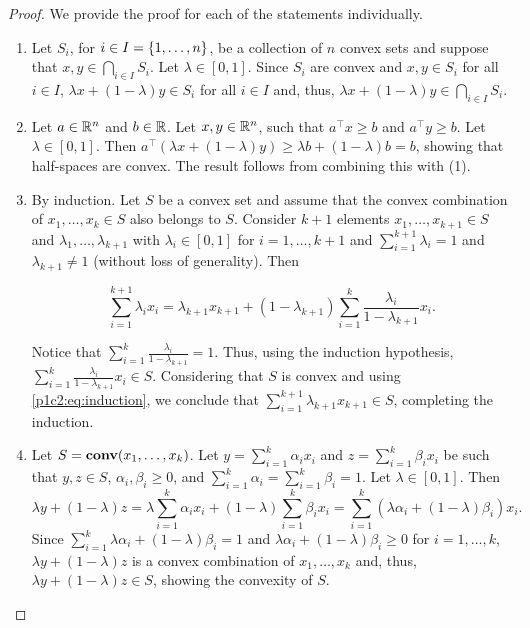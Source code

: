 \begin{proof}
	We provide the proof for each of the statements individually. 
	\begin{enumerate}
	 \item Let 	$S_i$, for $i \in I = \left\{ 1,\dots,n \right \}$, be a collection of $n$ convex sets and suppose that $x, y \in \bigcap_{i \in I} S_i$. Let $\lambda \in [0,1]$. Since $S_i$ are convex and $x,y \in S_i$ for all $i \in I$, $\lambda x + (1-\lambda) y \in S_i$ for all $i \in I$ and, thus, $\lambda x + (1-\lambda) y \in \bigcap_{i \in I} S_i$.
	
	\item Let $a \in \mathbb{R}^n$ and $b \in \mathbb{R}$. Let $x,y \in \mathbb{R}^n$, such that $a^\top x \geq b$ and $a^\top y \geq b$. Let $\lambda \in [0,1]$. Then $a^\top (\lambda x + (1-\lambda)y) \geq \lambda b + (1-\lambda)b = b$, showing that half-spaces are convex. The result follows from combining this with (1).    
	
	\item By induction. Let $S$ be a convex set and assume that the convex combination of $x_1, \dots, x_k \in S$ also belongs to $S$. Consider $k+1$ elements $x_1, \dots, x_{k+1} \in S$ and $\lambda_1, \dots, \lambda_{k+1}$ with $\lambda_i \in [0,1]$ for $i = 1,\dots, k+1$ and $\sum_{i=1}^{k+1}\lambda_i = 1$ and $\lambda_{k+1} \neq 1$ (without loss of generality). Then

	\begin{equation}
		\sum_{i=1}^{k+1}\lambda_i x_i = \lambda_{k+1}x_{k+1} + (1 - \lambda_{k+1}) \sum_{i=1}^k \frac{\lambda_i}{1 - \lambda_{k+1}}x_i. \label{p1c2:eq:induction}
	\end{equation}								

		Notice that $\sum_{i=1}^{k}\frac{\lambda_i}{1 - \lambda_{k+1}} = 1$. Thus, using the induction hypothesis, $\sum_{i=1}^{k}\frac{\lambda_i}{1 - \lambda_{k+1}}x_i \in S$. Considering that $S$ is convex and using \eqref{p1c2:eq:induction}, we conclude that $\sum_{i=1}^{k+1}\lambda_{k+1}x_{k+1} \in S$, completing the induction.
		
	\item Let $S = \mathop{\bf conv}(x_1, \dots, x_k)$. Let $y = \sum_{i=1}^k \alpha_i x_i$ and $z = \sum_{i=1}^k \beta_ix_i$ be such that $y,z \in S$, $\alpha_i,\beta_i \geq 0$, and $\sum_{i=1}^k \alpha_i = \sum_{i=1}^k \beta_i = 1$. Let $\lambda \in [0,1]$. Then
		\begin{equation}
			\lambda y + (1- \lambda)z = \lambda\sum_{i=1}^k \alpha_i x_i + (1-\lambda)\sum_{i=1}^k \beta_i x_i = \sum_{i=1}^k (\lambda \alpha_i + (1-\lambda) \beta_i)x_i. 	
		\end{equation}
		Since $\sum_{i=1}^k \lambda \alpha_i + (1-\lambda) \beta_i = 1$ and $\lambda \alpha_i + (1-\lambda) \beta_i \geq 0$ for $i=1,\dots,k$, $\lambda y + (1- \lambda)z$ is a convex combination of $x_1, \dots, x_k$ and, thus, $\lambda y + (1- \lambda)z \in S$, showing the convexity of $S$. \qedhere	
	\end{enumerate}	
\end{proof}

